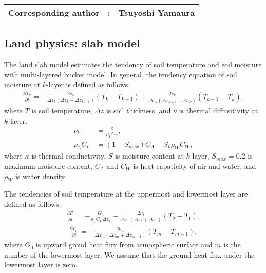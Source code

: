 {\bf \Large 
\begin{tabular}{ccc}
\hline
  Corresponding author & : & Tsuyoshi Yamaura\\
\hline
\end{tabular}
}


\subsection{Land physics: slab model}

The land slab model estimates the tendency of soil temperature and soil moisture with multi-layered bucket model.
In general, the tendency equation of soil moisture at $k$-layer is defined as follows:
\begin{align}
  \frac{\partial T_{k}}{\partial t} = - \frac{2\nu_{k}}{\Delta z_{k}(\Delta z_{k}+\Delta z_{k-1})} (T_{k}-T_{k-1}) + \frac{2\nu_{k}}{\Delta z_{k}(\Delta z_{k+1}+\Delta z_{k})} (T_{k+1}-T_{k}),
  \label{eq:Tdt-k}
\end{align}
where $T$ is soil temperature, $\Delta z$ is soil thickness, and $\nu$ is thermal diffusitivity at $k$-layer.
\begin{align}
  \nu_{k} &= \frac{\kappa}{\rho_{L}C_{L}}, \\
  \rho_{L}C_{L} &= ( 1 - S_{max} ) C_{A} + S_{k} \rho_{W}C_{W},
\end{align}
where $\kappa$ is thermal conductivity, $S$ is moisture content at $k$-layer, $S_{max} = 0.2$ is maximum moisture content, $C_{A}$ and $C_{W}$ is heat capaticity of air and water, and $\rho_{W}$ is water density.

The tendencies of soil temperature at the uppermost and lowermost layer are defined as follows:
\begin{align}
  \frac{\partial T_{1}}{\partial t} = - \frac{G_{0}}{\rho_{L}C_{L}\Delta z_{1}} + \frac{2\nu_{1}}{\Delta z_{1}(\Delta z_{2}+\Delta z_{1})} (T_{2}-T_{1}),
  \label{eq:Tdt-1}
\end{align}
\begin{align}
  \frac{\partial T_{m}}{\partial t} = - \frac{2\nu_{m}}{\Delta z_{m}(\Delta z_{m}+\Delta z_{m-1})} (T_{m}-T_{m-1}),
  \label{eq:Tdt-m}
\end{align}
where $G_{0}$ is upward groud heat flux from atmospheric surface and $m$ is the number of the lowermost layer.
We assume that the ground heat flux under the lowermost layer is zero.

